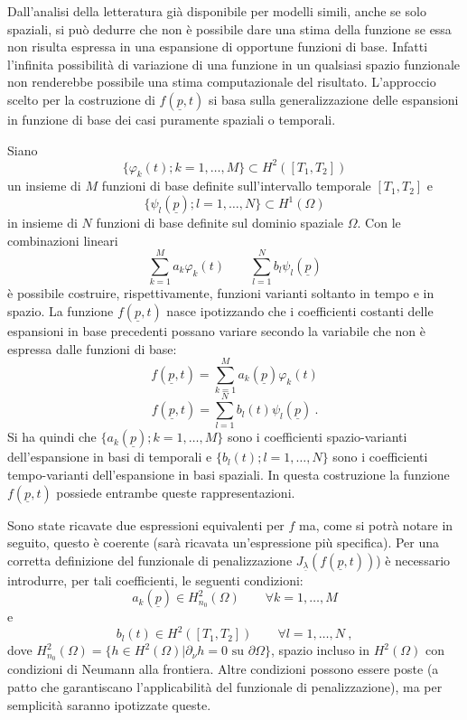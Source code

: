 \documentclass[a4paper,11pt,twoside,openright]{book}							%
\begin{document}
Dall'analisi della letteratura già disponibile per modelli simili, anche se solo spaziali, si può dedurre che non è possibile dare una stima della funzione se essa non risulta espressa in una espansione di opportune funzioni di base. Infatti l'infinita possibilità di variazione di una funzione in un qualsiasi spazio funzionale non renderebbe possibile una stima computazionale del risultato. L'approccio scelto per la costruzione di $f(\underline p,t)$ si basa sulla generalizzazione delle espansioni in funzione di base dei casi puramente spaziali o temporali.

Siano 
$$
\{ \varphi_k(t);k=1, \ldots , M \} \subset H^2([T_1,T_2])
$$
un insieme di $M$ funzioni di base definite sull'intervallo temporale $[T_1,T_2]$ e
$$
\{ \psi_l(\underline p);l=1, \ldots , N \} \subset H^1(\Omega)
$$
in insieme di $N$ funzioni di base definite sul dominio spaziale $\Omega$. Con le combinazioni lineari
$$
\sum_{k=1}^M a_k\varphi_k(t) \qquad \sum_{l=1}^N b_l\psi_l(\underline p)
$$
è possibile costruire, rispettivamente, funzioni varianti soltanto in tempo e in spazio. La funzione $f(\underline p,t)$ nasce ipotizzando che i coefficienti costanti delle espansioni in base precedenti possano variare secondo la variabile che non è espressa dalle funzioni di base:
\begin{equation} 
\label{eq:f_temp}
f(\underline p, t) = \sum_{k=1}^M a_k(\underline p)\varphi_k(t)
\end{equation}
\begin{equation}
\label{eq:f_space}
f(\underline p, t) = \sum_{l=1}^N b_l(t)\psi_l(\underline p) \ .
\end{equation}
Si ha quindi che $\{ a_k(\underline p);k=1, \ldots , M \}$ sono i coefficienti spazio-varianti dell'espansione in basi di temporali e $\{ b_l(t);l=1, \ldots , N \}$ sono i coefficienti tempo-varianti dell'espansione in basi spaziali. In questa costruzione la funzione $f(\underline p,t)$ possiede entrambe queste rappresentazioni.

Sono state ricavate due espressioni equivalenti per $f$ ma, come si potrà notare in seguito, questo è coerente (sarà ricavata un'espressione più specifica). Per una corretta definizione del funzionale di penalizzazione $J_{\underline \lambda }(f(\underline p,t))$) è necessario introdurre, per tali coefficienti, le seguenti condizioni:
$$
a_k(\underline p) \in H_{n_0}^2(\Omega) \qquad \forall k=1, \ldots , M
$$
e
$$
b_l(t) \in H^2([T_1,T_2]) \qquad \forall l=1, \ldots , N \ ,
$$
dove $H^2_{n_0}(\Omega) = \{h \in H^2(\Omega) | \partial _{\nu}h=0 \mbox{ su } \partial \Omega\}$, spazio incluso in $H^2(\Omega)$ con condizioni di Neumann alla frontiera. Altre condizioni possono essere poste (a patto che garantiscano l'applicabilità del funzionale di penalizzazione), ma per semplicità saranno ipotizzate queste.
\end{document}
